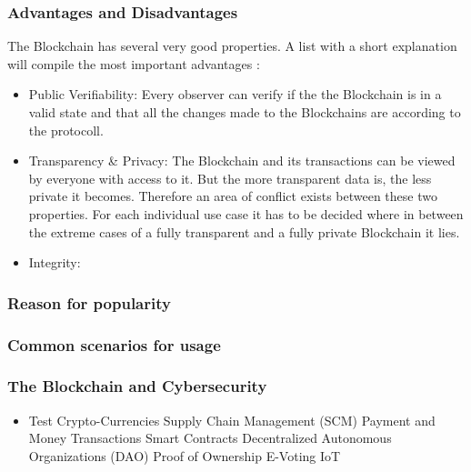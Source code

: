 \subsubsection{Advantages and Disadvantages}
The Blockchain has several very good properties. A list with a short explanation will compile the most important advantages \cite{Wust2017}:
\begin{itemize}
	\item Public Verifiability: Every observer can verify if the the Blockchain is in a valid state and that all the changes made to the Blockchains are according to the protocoll.
	\item Transparency & Privacy: The Blockchain and its transactions can be viewed by everyone with access to it. But the more transparent data is, the less private it becomes. Therefore an area of conflict exists between these two properties. For each individual use case it has to be decided where in between the extreme cases of a fully transparent and a fully private Blockchain it lies.
	\item Integrity: 
\end{itemize}
\subsubsection{Reason for popularity}
\subsubsection{Common scenarios for usage}
\subsubsection{The Blockchain and Cybersecurity}


\begin{itemize}
\item Test
  \subitem Crypto-Currencies
  \subitem Supply Chain Management (SCM)
  \subitem Payment and Money Transactions
  \subitem Smart Contracts
  \subitem Decentralized Autonomous Organizations (DAO)
  \subitem Proof of Ownership
  \subitem E-Voting
  \subitem IoT
\end{itemize}
